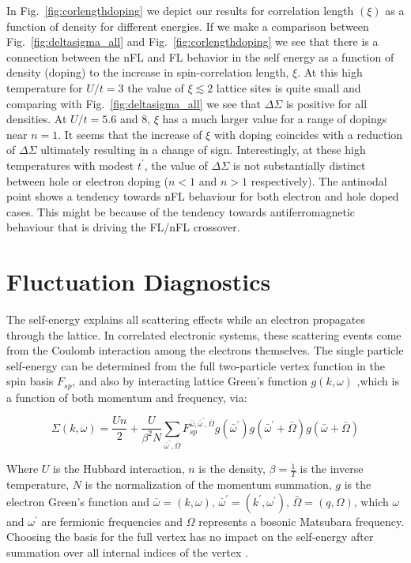  In Fig.~\ref{fig:corlengthdoping} we depict our results for correlation length $(\xi)$ as a function of density for different energies.  If we make a comparison between Fig.~\ref{fig:deltasigma_all} and Fig.~\ref{fig:corlengthdoping} we see that there is a connection between the nFL and FL behavior in the self energy as a function of density (doping) to the increase in spin-correlation length, $\xi$.  
At this high temperature for $U/t=3$ the value of $\xi \lesssim 2$ lattice sites is quite small and comparing with Fig.~\ref{fig:deltasigma_all} we see that $\Delta \Sigma$ is positive for all densities.  At $U/t=5.6$ and 8, $\xi$ has a much larger value for a range of dopings near $n=1$.  It seems that the increase of $\xi$ with doping coincides with a reduction of $\Delta \Sigma$ ultimately resulting in a change of sign.  Interestingly, at these high temperatures with modest $t^\prime$, the value of $\Delta \Sigma$ is not substantially distinct between hole or electron doping ($n<1$ and $n>1$ respectively).  The antinodal point shows a tendency towards nFL behaviour for both electron and hole doped cases. This might be because of the tendency towards antiferromagnetic behaviour that is driving the FL/nFL crossover.

\section{Fluctuation Diagnostics}

The self-energy explains all scattering effects while an electron propagates through the lattice. In correlated electronic systems, these scattering events come from the Coulomb interaction among the electrons themselves. The single particle self-energy can be determined from the full two-particle vertex function in the spin basis $F_{sp}$,\cite{Valli, Toschi} and also by  interacting lattice Green's function $g(k,\omega)$ ,which is a function of both momentum and frequency, via:

\begin{equation}
    \Sigma(k,\omega)= \frac{Un}{2}+ \frac{U}{\beta^2 N} \sum \limits_{\bar{\omega}^\prime ,\bar{\Omega}} F_{sp}^{\bar{\omega},\bar{\omega}^\prime,\bar{\Omega}} g(\bar{\omega}^\prime)g(\bar{\omega}^\prime +\bar{\Omega}) g(\bar{\omega}+\bar{\Omega})
    \label{eqn:fluct}
\end{equation}

\noindent Where $U$ is the Hubbard interaction, $n$ is the density, $\beta = \frac{1}{T}$ is the
inverse temperature, $N$ is the normalization of the
momentum summation, $g$ is the electron Green's function and $\bar{\omega}=(k,\omega)$, $\bar{\omega}^\prime=(k^\prime,\omega^\prime)$, $\bar{\Omega}=(q,\Omega)$, which $\omega$ and $\omega^\prime$ are fermionic frequencies and $\Omega$ represents a bosonic Matsubara frequency. Choosing the basis for the full vertex has no impact on the self-energy after summation over all internal indices of the vertex \cite{Toschi}.

